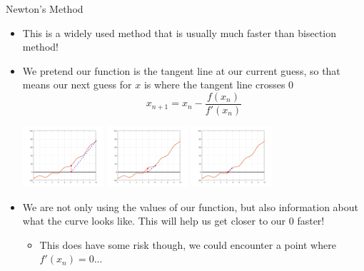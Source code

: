 {}\documentclass[letterpaper,
compress,
xcolor=x11names,
]{beamer}
\begin{document}
\begin{frame}{Newton's Method}
	\footnotesize
	\begin{itemize}
		\item This is a widely used method that is usually much faster than bisection method!
		\item We pretend our function is the tangent line at our current guess, so that means our next guess for $x$ is where the tangent line crosses 0
		\begin{equation*}
			x_{n+1} = x_n - \frac{f(x_n)}{f'(x_n)}
		\end{equation*}
		\begin{center}
			\includegraphics[width = 3cm]{newton_1.png} \hspace{0.25cm}
			\includegraphics[width = 3cm]{newton_2.png} \hspace{0.25cm}
			\includegraphics[width = 3cm]{newton_3.png}
		\end{center}
		\item We are not only using the values of our function, but also information about what the curve looks like. This will help us get closer to our 0 faster!
		\begin{itemize}
			\item This does have some risk though, we could encounter a point where $f'(x_n) = 0$...
		\end{itemize}
	\end{itemize}
	
\end{frame}

\end{document}
